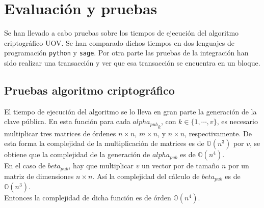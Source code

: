 \chapter{Evaluación y pruebas}


Se han llevado a cabo pruebas sobre los tiempos de ejecución del algoritmo criptográfico UOV. Se han comparado dichos tiempos en dos lenguajes de programación \texttt{python} y \texttt{sage}. Por otra parte las pruebas de la integración han sido realizar una transacción y ver que esa transacción se encuentra en un bloque.\\


\section{Pruebas algoritmo criptográfico}

El tiempo de ejecución del algoritmo se lo lleva en gran parte la generación de la clave pública. En esta función para cada ${alpha_{pub}}_k$, con $k \in \{1,\cdots, v\}$, es necesario multiplicar tres matrices de órdenes $n \times n$, $m \times n$, y $n \times n$, respectivamente. De esta forma la complejidad de la multiplicación de matrices es de $\mathds{O}(n^3)$ por $v$, se obtiene que la complejidad de la generación de $alpha_{pub}$ es de $\mathds{O}(n^4)$.\\

En el caso de $beta_{pub}$, hay que multiplicar $v$ un vector por de tamaño $n$ por un matriz de dimensiones $n \times n$. Así la complejidad del cálculo de $beta_{pub}$ es de $\mathds{O}(n^3)$.\\

Entonces la complejidad de dicha función es de órden $\mathds{O}(n^4)$.\\

